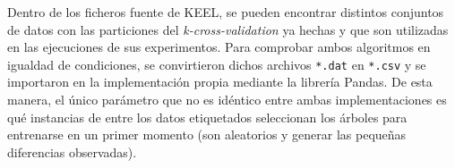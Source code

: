 \begin{table}
	\caption[\textit{Co-forest}: comparativa entre KEEL y la implementación propia]{Comparativa entre la \textit{accuracy} del \textit{co-forest} de KEEL y la implementación propia sobre el conjunto de \textit{test}.}
	\label{tabla_coforest_keelvsnuestro}	
\end{table}

Dentro de los ficheros fuente de KEEL, se pueden encontrar distintos conjuntos de datos con las particiones del \textit{k-cross-validation} ya hechas y que son utilizadas en las ejecuciones de sus experimentos. Para comprobar ambos algoritmos en igualdad de condiciones, se convirtieron dichos archivos \texttt{*.dat} en \texttt{*.csv} y se importaron en la implementación propia mediante la librería Pandas. De esta manera, el único parámetro que no es idéntico entre ambas implementaciones es qué instancias de entre los datos etiquetados seleccionan los árboles para entrenarse en un primer momento (son aleatorios y generar las pequeñas diferencias observadas).

